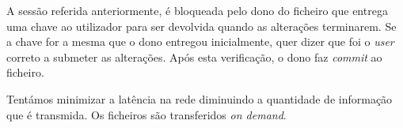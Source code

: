 A sessão referida anteriormente, é bloqueada pelo dono do ficheiro que entrega uma chave ao utilizador para ser devolvida quando as alterações terminarem. Se a chave for a mesma que o dono entregou inicialmente, quer dizer que foi o \textit{user} correto a submeter as alterações. Após esta verificação, o dono faz \textit{commit} ao ficheiro.

Tentámos minimizar a latência na rede diminuindo a quantidade de informação que é transmida. Os ficheiros são transferidos \textit{on demand}.